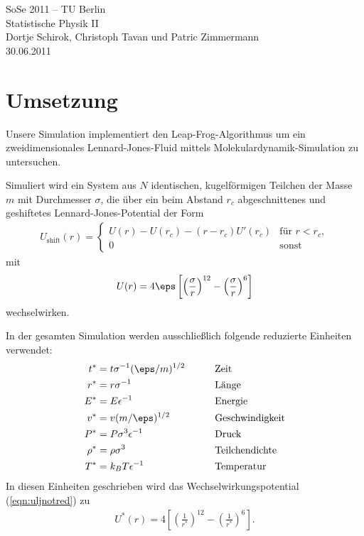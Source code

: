 \documentclass[11pt,a4paper]{article}
\newcommand{\ind}[1]{_{\mathrm{#1}}}
\begin{document}

\begin{center}
SoSe 2011 -- TU Berlin\\
Statistische Physik II\\
Dortje Schirok, Christoph Tavan und Patric Zimmermann\\
30.06.2011
\end{center}

\section{Umsetzung}
Unsere Simulation implementiert den Leap-Frog-Algorithmus um ein zweidimensionales Lennard-Jones-Fluid mittels Molekulardynamik-Simulation zu untersuchen.

Simuliert wird ein System aus $N$ identischen, kugelförmigen Teilchen der Masse $m$ mit Durchmesser $\sigma$, die über ein beim Abstand $r_c$ abgeschnittenes und geshiftetes Lennard-Jones-Potential der Form
\begin{align}
	U\ind{shift}(r) = 
	\begin{cases} 
	U(r) - U(r_c) - (r - r_c) U'(r_c) & \text{für $r < r_c$},\\ 
	0& \text{sonst}
	\end{cases}
\end{align}
mit
\begin{align}
	U(r)=4 \eps \left[ \left( \frac{\sigma}{r}  \right)^{12} - \left( \frac{\sigma}{r}  \right)^6 \right] \label{eqn:uljnotred}
\end{align}
wechselwirken.

In der gesamten Simulation werden ausschließlich folgende reduzierte Einheiten verwendet:
\begin{alignat*}{2}
t^* &= t \sigma^{-1} (\eps/m)^{1/2} &\quad\quad&\text{Zeit}\\
r^* &= r \sigma^{-1} &\quad\quad&\text{Länge}\\
E^* &= E \epsilon^{-1} &&\text{Energie}\\
v^* &= v (m/\eps)^{1/2} &\quad\quad&\text{Geschwindigkeit}\\
P^* &= P \sigma^3 \epsilon^{-1} &&\text{Druck}\\
\rho^* &= \rho \sigma^3 && \text{Teilchendichte}\\
T^* &= k_B T \epsilon^{-1} && \text{Temperatur}
\end{alignat*}
In diesen Einheiten geschrieben wird das Wechselwirkungspotential (\ref{eqn:uljnotred}) zu
\begin{align}
	U^*(r) = 4 \left[ \left( \frac{1}{r^*}  \right)^{12} - \left( \frac{1}{r^*}  \right)^6 \right] \label{eqn:ulj}.
\end{align}
\end{document}
